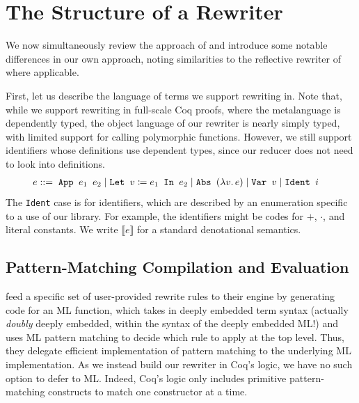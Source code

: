 \section{The Structure of a Rewriter} \label{sec:structure}

We now simultaneously review the approach of \textcite{Aehlig} and introduce some notable differences in our own approach, noting similarities to the reflective rewriter of \textcite{rtac} where applicable.

First, let us describe the language of terms we support rewriting in.
Note that, while we support rewriting in full-scale Coq proofs, where the metalanguage is dependently typed, the object language of our rewriter is nearly simply typed, with limited support for calling polymorphic functions.
However, we still support identifiers whose definitions use dependent types, since our reducer does not need to look into definitions.
\begin{align*}
  e ::={}& \phantom{\mid} \texttt{App }e_1\texttt{ }e_2 \mid \texttt{Let }v \defeq e_1\texttt{ In }e_2 %
  \mid \texttt{Abs }(\lambda v.\,e) \mid \texttt{Var }v \mid \texttt{Ident }i
\end{align*}
The \texttt{Ident} case is for identifiers, which are described by an enumeration specific to a use of our library.
For example, the identifiers might be codes for $+$, $\cdot$, and literal constants.
We write $\llbracket e \rrbracket$ for a standard denotational semantics.

\subsection{Pattern-Matching Compilation and Evaluation} \label{sec:pattern-matching-compilation-and-evaluation}

\textcite{Aehlig} feed a specific set of user-provided rewrite rules to their engine by generating code for an ML function, which takes in deeply embedded term syntax (actually \emph{doubly} deeply embedded, within the syntax of the deeply embedded ML!) and uses ML pattern matching to decide which rule to apply at the top level.
Thus, they delegate efficient implementation of pattern matching to the underlying ML implementation.
As we instead build our rewriter in Coq's logic, we have no such option to defer to ML.
Indeed, Coq's logic only includes primitive pattern-matching constructs to match one constructor at a time.

